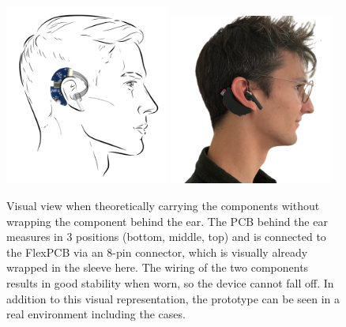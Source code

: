 \begin{figure}[t]
    \centering
    \includegraphics[width=0.48\textwidth]{thesis-doc/images/prototype/prototype_on_head_visual.png}
    \includegraphics[width=0.48\textwidth]{thesis-doc/images/prototype/Lorenz.png}
    \caption{Visual view when theoretically carrying the components without wrapping the component behind the ear. The PCB behind the ear measures in 3 positions (bottom, middle, top) and is connected to the FlexPCB via an 8-pin connector, which is visually already wrapped in the sleeve here. The wiring of the two components results in good stability when worn, so the device cannot fall off. In addition to this visual representation, the prototype can be seen in a real environment including the cases.}
    \label{fig:design:prototype_on_head_visual}
\end{figure}

